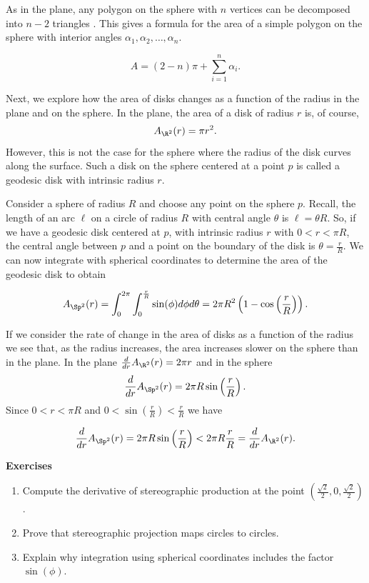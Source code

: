 As in the plane, any polygon on the sphere with $n$ vertices can be decomposed
into $n-2$ triangles \cite{orourke_computational_1994}. This gives a formula for the area of a simple polygon
on the sphere with interior angles $\alpha_1,\alpha_2,\ldots, \alpha_n$.

\begin{equation} \label{eqn:sphere-area}
	A=(2-n)\pi +\sum_{i=1}^n \alpha_i.
\end{equation}


Next, we explore how the area of disks changes as a function 
of the radius in the plane and on the sphere. 
In the plane, the area of a disk of radius $r$ is, of course,
$$A_{\R^2}(r)=\pi r^2.$$ However, this is not the case for the sphere where
the radius of the disk curves along the surface. Such a disk on the sphere
centered at a point $p$
is called a geodesic disk with intrinsic radius $r$.

Consider a sphere of radius $R$ and choose any point on the sphere $p.$
Recall, the length of an arc $\ell$ on a circle of radius $R$ with central angle $\theta$
is $\ell=\theta R.$ So, if we have a geodesic disk centered at $p$, with intrinsic radius $r$ with
$0<r<\pi R$,
the central angle between $p$ and a point on the boundary of the disk is 
$\theta=\frac{r}{R}.$ We can now integrate with spherical coordinates 
to determine the area of the geodesic disk to obtain

\begin{equation} \label{eqn:sphere-disk-area}
	A_{\Sp^2}(r)=\int_0^{2\pi}\int_0^{\frac{r}{R}}\sin(\phi)d\phi d\theta = 2\pi R^2\left(1-\cos\left(\frac{r}{R}\right)\right).
\end{equation}

If we consider the rate of change in the area of disks as a function of the radius
we see that, as the radius increases, the area increases slower on the sphere
than in the plane. 
In the plane $\frac{d}{dr}A_{\R^2}(r) =2\pi r$ and in the sphere
$$\frac{d}{dr}A_{\Sp^2}(r)=2\pi R\sin \left(\frac{r}{R}\right).$$
Since $0<r<\pi R$ and $0<\sin\left(\frac{r}{R}\right)< \frac{r}{R}$ we have

$$\frac{d}{dr}A_{\Sp^2}(r)=2\pi R\sin \left(\frac{r}{R}\right)<2\pi R \frac{r}{R}=\frac{d}{dr}A_{\R^2}(r).$$


\noindent \textbf{Exercises}


\begin{enumerate}
	\item Compute the derivative of stereographic production at the point $(\frac{\sqrt{2}}{2},0,\frac{\sqrt{2}}{2})$.
	
	\item Prove that stereographic projection maps circles to circles.
	
	\item Explain why integration using spherical coordinates includes the factor $\sin(\phi).$
	
\end{enumerate}

\pagebreak